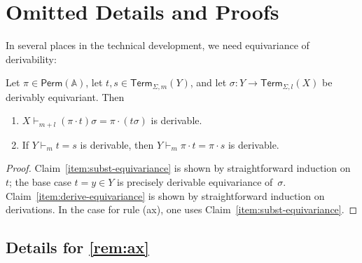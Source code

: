 \documentclass[a4paper,UKenglish,cleveref,thm-restate,numberwithinsect,final]{lipics-v2021}
\newif\iffullversion
\newcommand{\Perm}{\mathsf{Perm}(\Names)}
\newcommand{\Term}{\mathsf{Term}}
\newcommand{\Names}{\mathbb{A}}
\theoremstyle{plain}
\numberwithin{equation}{section}
\newcommand{\+}[1]{\mathcal{#1}\xspace}
\theoremstyle{definition}
\begin{document}


\iffullversion

\clearpage
\appendix

\section{Omitted Details and Proofs}

In several places in the technical development, we need equivariance
of derivability:
\begin{lemma}\label{lem:equivariance}
  Let $\pi\in \Perm$, let $t,s\in\Term_{\Sigma,m}(Y)$, and let
  \(\sigma\colon Y \to \Term_{\Sigma, l}(X)\) be derivably
  equivariant. Then
  \begin{enumerate}
  \item\label{item:subst-equivariance}
    $X\vdash_{m+l}(\pi\cdot t)\sigma=\pi\cdot(t\sigma)$ is derivable.

  \item\label{item:derive-equivariance} If $Y\vdash_mt=s$ is
    derivable, then
    \(Y \vdash_m \pi\cdot t = \pi\cdot s\) is
    derivable.
  \end{enumerate}
\end{lemma}


\begin{proof}
  Claim~\ref{item:subst-equivariance} is shown by straightforward
  induction on~$t$; the base case $t=y\in Y$ is precisely derivable
  equivariance of~$\sigma$.  Claim~\ref{item:derive-equivariance} is
  shown by straightforward induction on derivations. In the case for
  rule (ax), one uses Claim~\ref{item:subst-equivariance}.
\end{proof}
\subsection*{Details for  \cref{rem:ax}}
\end{document}
